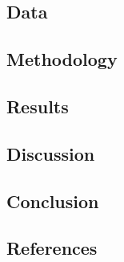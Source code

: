 \documentclass[a4paper,conference]{IEEEtran}
\begin{document}
\subsection{Data}\label{sec:data}

\subsection{Methodology}\label{sec:methodology}

\subsection{Results}\label{sec:results}

\subsection{Discussion}\label{sec:discussion}

\subsection{Conclusion}\label{sec:conclusion}

\subsection{References}\label{sec:references}


\end{document}
